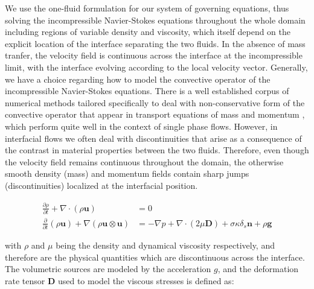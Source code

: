 We use the one-fluid formulation for our system of governing equations, thus solving 
the incompressible Navier-Stokes equations throughout the whole domain including regions 
of variable density and viscosity, which itself depend on the explicit 
location of the interface separating the two fluids.
In the absence of mass tranfer, the velocity field is continuous across
the interface at the incompressible limit, with the interface evolving according to the local velocity vector.  
Generally, we have a choice regarding how to model the convective operator
of the incompressible Navier-Stokes equations. There is a well established corpus of 
numerical methods tailored specifically to deal with non-conservative 
 form of the convective 
operator that appear in transport equations of mass and momentum 
, which perform quite well in the context of single phase flows.
However, in interfacial flows we often deal with discontinuities that arise as a consequence
of the contrast in material properties between the two fluids. Therefore, even though the velocity field
remains continuous throughout the domain, the otherwise smooth density (mass) and momentum fields 
contain sharp jumps (discontinuities) localized at the interfacial position.     






\begin{align} 
	\frac{\partial \rho}{\partial t} + \nabla\cdot \left(\rho\boldsymbol{u}\right) &= 0 \nonumber \\
	\frac{\partial}{\partial t} \left(\rho\boldsymbol{u}\right) + \nabla\left(\rho\boldsymbol{u}\otimes\boldsymbol{u}\right)  &= -\nabla p + \nabla \cdot \left(2 \mu \boldsymbol{D}\right) + \sigma \kappa \delta_{s}\boldsymbol{n} + \rho \boldsymbol{g}
\label{nseqn}
\end{align}


with $\rho$ and $\mu$ being the density and dynamical viscosity respectively, and therefore are the physical quantities which are discontinuous across the interface. The volumetric sources are modeled by the acceleration $g$, and the deformation rate tensor $\boldsymbol{D}$ used to model the viscous stresses is defined as:  

